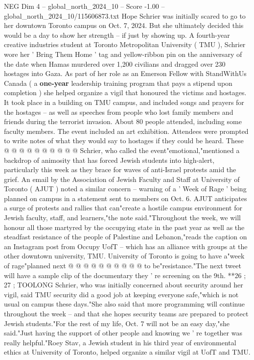 \begin{textsample}{NEG Dim 4 – global\_north\_2024\_10 – Score -1.00 – global\_north\_2024\_10/115606873.txt}  \label{ex:f4_neg_055}
Hope Schrier was initially scared to go to her downtown Toronto campus on Oct. 7, 2024.
But she ultimately decided this would be a day to show her strength -- if just by showing up.
A fourth-year creative industries student at Toronto Metropolitan University ( TMU ), Schrier wore her ' Bring Them Home ' tag and yellow-ribbon pin on the anniversary of the date when Hamas murdered over 1,200 civilians and dragged over 230 hostages into Gaza.
As part of her role as an Emerson Fellow with StandWithUs Canada ( a \textbf{one-year} leadership training program that pays a stipend upon completion ) she helped organize a vigil that honoured the victims and hostages.
It took place in a building on TMU campus, and included songs and prayers for the hostages -- as well as speeches from people who lost family members and friends during the terrorist invasion.
About 80 people attended, including some faculty members.
The event included an art exhibition.
Attendees were prompted to write notes of what they would say to hostages if they could be heard.
These @ @ @ @ @ @ @ @ @ @ Schrier, who called the event"emotional,"mentioned a backdrop of animosity that has forced Jewish students into high-alert, particularly this week as they brace for waves of anti-Israel protests amid the grief.
An email by the Association of Jewish Faculty and Staff at University of Toronto ( AJUT ) noted a similar concern -- warning of a ' Week of Rage ' being planned on campus in a statement sent to members on Oct. 6.
AJUT anticipates a surge of protests and rallies that can"create a hostile campus environment for Jewish faculty, staff, and learners,"the note said."Throughout the week, we will honour all those martyred by the occupying state in the past year as well as the steadfast resistance of the people of Palestine and Lebanon,"reads the caption on an Instagram post from Occupy UofT -- which has an alliance with groups at the other downtown university, TMU.
University of Toronto is going to have a"week of rage"planned next @ @ @ @ @ @ @ @ @ @ to be"resistance."The next tweet will have a sample clip of the documentary they ' re screening on the 9th. **26 ; 27 ; TOOLONG Schrier, who was initially concerned about security around her vigil, said TMU security did a good job at keeping everyone safe,"which is not usual on campus these days."She also said that more programming will continue throughout the week -- and that she hopes security teams are prepared to protect Jewish students."For the rest of my life, Oct. 7 will not be an easy day,"she said."Just having the support of other people and knowing we ' re together was really helpful."Roey Stav, a Jewish student in his third year of environmental ethics at University of Toronto, helped organize a similar vigil at UofT and TMU.

\end{textsample}
